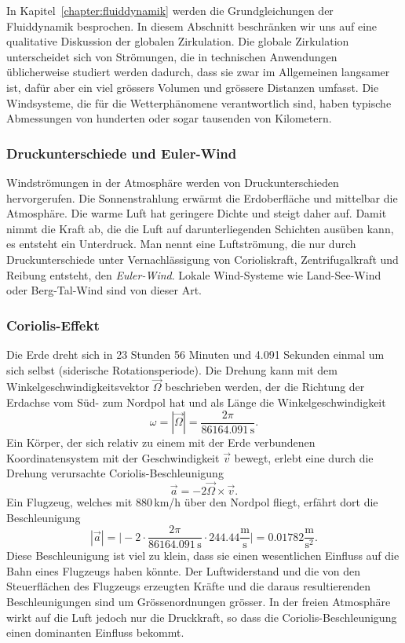 In Kapitel~\ref{chapter:fluiddynamik} werden die Grundgleichungen
der Fluiddynamik besprochen.
In diesem Abschnitt beschränken wir uns auf eine qualitative
Diskussion der globalen Zirkulation.
Die globale Zirkulation unterscheidet sich von Strömungen, die 
in technischen Anwendungen üblicherweise studiert werden dadurch,
dass sie zwar im Allgemeinen langsamer ist, dafür aber ein viel grössers
Volumen und grössere Distanzen umfasst.
Die Windsysteme, die für die Wetterphänomene verantwortlich sind,
haben typische Abmessungen von hunderten oder sogar tausenden von
Kilometern.

\subsubsection{Druckunterschiede und Euler-Wind}
Windströmungen in der Atmosphäre werden von Druckunterschieden
hervorgerufen.
Die Sonnenstrahlung erwärmt die Erdoberfläche und mittelbar die
Atmosphäre.
Die warme Luft hat geringere Dichte und steigt daher auf.
Damit nimmt die Kraft ab, die die Luft auf darunterliegenden
Schichten ausüben kann, es entsteht ein Unterdruck.
Man nennt eine Luftströmung, die nur durch Druck\-unterschiede
unter Vernachlässigung von Corioliskraft, Zentrifugalkraft und
Reibung entsteht, den {\em Euler-Wind}.
Lokale Wind-Systeme wie Land-See-Wind oder Berg-Tal-Wind sind von
dieser Art.

\subsubsection{Coriolis-Effekt}
%
%
Die Erde dreht sich in 23 Stunden 56 Minuten und 4.091 Sekunden
einmal um sich selbst (siderische Rotationsperiode).
%
Die Drehung kann mit dem Winkelgeschwindigkeitsvektor
$\vec{\Omega}$
beschrieben werden, der die Richtung der Erdachse vom Süd- zum Nordpol
hat und als Länge die Winkelgeschwindigkeit
\[
\omega
=
|\vec{\Omega}|
=
\frac{2\pi}{86164.091\,\text{s}}.
\]
Ein Körper, der sich relativ zu einem mit der Erde verbundenen
Koordinatensystem mit der Geschwindigkeit $\vec{v}$ bewegt,
erlebt eine durch die Drehung verursachte Coriolis-Beschleunigung
\[
\vec{a} = -2\vec{\Omega}\times\vec{v}.
\]
Ein Flugzeug, welches mit 880\,km/h über den Nordpol fliegt,
erfährt dort die Beschleunigung 
\[
|\vec{a}|
=
\biggl|
-2
\cdot
\frac{2\pi}{86164.091\,\text{s}}
\cdot
244.44\frac{\text{m}}{\text{s}}
\biggr|
=
0.01782\frac{\text{m}}{\text{s}^2}.
\]
Diese Beschleunigung ist viel zu klein, dass sie einen wesentlichen
Einfluss auf die Bahn eines Flugzeugs haben könnte.
Der Luftwiderstand und die von den Steuerflächen des Flugzeugs erzeugten
Kräfte und die daraus resultierenden Beschleunigungen sind
um Grössenordnungen grösser.
In der freien Atmosphäre wirkt auf die Luft jedoch nur die Druckkraft,
so dass die Coriolis-Beschleunigung einen dominanten Einfluss bekommt.

